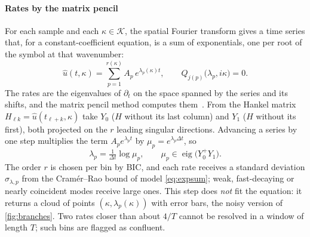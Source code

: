 \paragraph{Rates by the matrix pencil} For each sample and each $\kappa\in\mathcal K$, the spatial Fourier transform gives
a time series that, for a constant-coefficient equation, is a sum of exponentials, one per root of the symbol at that
wavenumber:
\begin{equation}\label{eq:expsum}
  \hat u(t,\kappa)=\sum_{p=1}^{r(\kappa)}A_p\,e^{\lambda_p(\kappa)t},\qquad Q_{j(p)}\big(\lambda_p,i\kappa\big)=0 .
\end{equation}
The rates are the eigenvalues of $\partial_t$ on the space spanned by the series and its shifts, and the matrix pencil
method computes them~\cite{HuaSar90}. From the Hankel matrix $H_{\ell k}=\hat u(t_{\ell+k},\kappa)$ take $Y_0$ ($H$ without
its last column) and $Y_1$ ($H$ without its first), both projected on the $r$ leading singular directions. Advancing a
series by one step multiplies the term $A_pe^{\lambda_pt}$ by $\mu_p=e^{\lambda_p\Delta t}$, so
\begin{equation}\label{eq:pencil}
  \lambda_p=\tfrac{1}{\Delta t}\log\mu_p,\qquad \mu_p\in\operatorname{eig}\big(Y_0^{+}Y_1\big).
\end{equation}
The order $r$ is chosen per bin by BIC, and each rate receives a standard deviation $\sigma_{\lambda,p}$ from the
Cram\'er--Rao bound of model \eqref{eq:expsum}; weak, fast-decaying or nearly coincident modes receive large ones.
This step does \emph{not} fit the equation: it returns a cloud of points $(\kappa,\lambda_p(\kappa))$ with error bars, the
noisy version of \cref{fig:branches}. Two rates closer than about $4/T$ cannot be resolved in a window of length $T$; such
bins are flagged as confluent.

